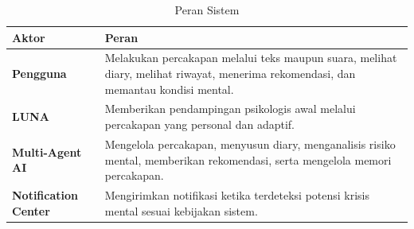 \begin{table}[H]
\centering
\renewcommand{\arraystretch}{1.35}
\renewcommand{\tabularxcolumn}[1]{m{#1}}
\caption{Peran Sistem}
\vspace{0.3em}
\small
\begin{tabularx}{\textwidth}{| >{\bfseries}l | X |}
\hline
\rowcolor{TableHeaderPurple}
\color{white}\bfseries Aktor & \color{white}\bfseries Peran \\
\hline
Pengguna & Melakukan percakapan melalui teks maupun suara, melihat diary, melihat riwayat, menerima rekomendasi, dan memantau kondisi mental. \\
\hline
\rowcolor{TableAltRowBg}
LUNA & Memberikan pendampingan psikologis awal melalui percakapan yang personal dan adaptif. \\
\hline
Multi-Agent AI & Mengelola percakapan, menyusun diary, menganalisis risiko mental, memberikan rekomendasi, serta mengelola memori percakapan. \\
\hline
\rowcolor{TableAltRowBg}
Notification Center & Mengirimkan notifikasi ketika terdeteksi potensi krisis mental sesuai kebijakan sistem. \\
\hline
\end{tabularx}
\end{table}
